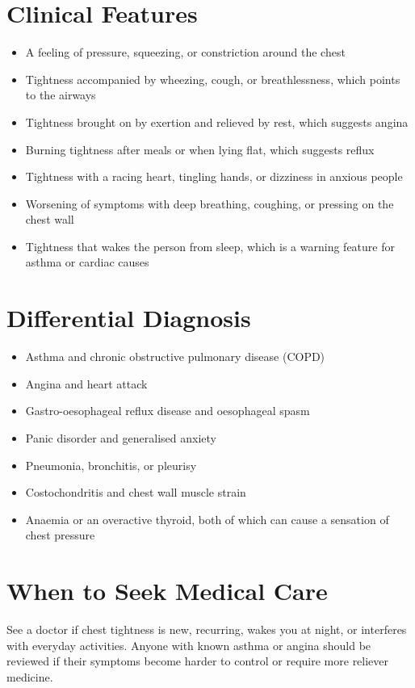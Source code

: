 \section*{Clinical Features}
\begin{itemize}
    \item A feeling of pressure, squeezing, or constriction around the chest
    \item Tightness accompanied by wheezing, cough, or breathlessness, which points to the airways
    \item Tightness brought on by exertion and relieved by rest, which suggests angina
    \item Burning tightness after meals or when lying flat, which suggests reflux
    \item Tightness with a racing heart, tingling hands, or dizziness in anxious people
    \item Worsening of symptoms with deep breathing, coughing, or pressing on the chest wall
    \item Tightness that wakes the person from sleep, which is a warning feature for asthma or cardiac causes
\end{itemize}

\section*{Differential Diagnosis}
\begin{itemize}
    \item Asthma and chronic obstructive pulmonary disease (COPD)
    \item Angina and heart attack
    \item Gastro-oesophageal reflux disease and oesophageal spasm
    \item Panic disorder and generalised anxiety
    \item Pneumonia, bronchitis, or pleurisy
    \item Costochondritis and chest wall muscle strain
    \item Anaemia or an overactive thyroid, both of which can cause a sensation of chest pressure
\end{itemize}

\section*{When to Seek Medical Care}
See a doctor if chest tightness is new, recurring, wakes you at night, or interferes with everyday activities. Anyone with known asthma or angina should be reviewed if their symptoms become harder to control or require more reliever medicine.

